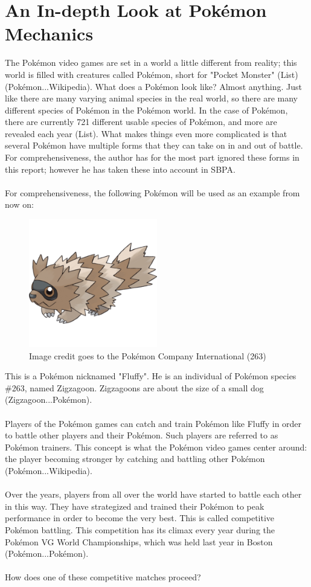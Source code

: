 \documentclass{article}
\begin{document}
\section{An In-depth Look at Pok\'emon Mechanics}
The Pok\'emon video games are set in a world a little different from reality; this world is filled with creatures called Pok\'emon, short for "Pocket Monster" (List)(Pok\'emon...Wikipedia). What does a Pok\'emon look like? Almost anything. Just like there are many varying animal species in the real world, so there are many different species of Pok\'emon in the Pok\'emon world. In the case of Pok\'emon, there are currently 721 different usable species of Pok\'emon, and more are revealed each year (List). What makes things even more complicated is that several Pok\'emon have multiple forms that they can take on in and out of battle. For comprehensiveness, the author has for the most part ignored these forms in this report; however he has taken these into account in SBPA.\\\\
For comprehensiveness, the following Pok\'emon will be used as an example from now on:
\begin{figure}[H]
	\includegraphics[width=0.5\textwidth]{fluffy.png}
	\centering
	\caption{Image credit goes to the Pok\'emon Company International (263)}
\end{figure}
This is a Pok\'emon nicknamed "Fluffy". He is an individual of Pok\'emon species \#263, named Zigzagoon. Zigzagoons are about the size of a small dog (Zigzagoon...Pok\'emon).\\\\
Players of the Pok\'emon games can catch and train Pok\'emon like Fluffy in order to battle other players and their Pok\'emon. Such players are referred to as Pok\'emon trainers. This concept is what the Pok\'emon video games center around: the player becoming stronger by catching and battling other Pok\'emon (Pok\'emon...Wikipedia).\\\\
Over the years, players from all over the world have started to battle each other in this way. They have strategized and trained their Pok\'emon to peak performance in order to become the very best. This is called competitive Pok\'emon battling. This competition has its climax every year during the Pok\'emon VG World Championships, which was held last year in Boston (Pok\'emon...Pok\'emon).\\\\
How does one of these competitive matches proceed?
\end{document}
